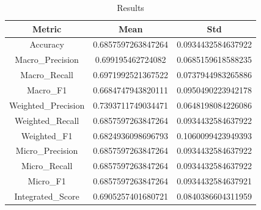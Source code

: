 \begin{table}[htbp]
\centering
\caption{Results}
\label{tab:csv}
\small
\setlength{\tabcolsep}{4pt}
\begin{tabular}{|c|c|c|}
\hline
Metric & Mean & Std \\
\hline
Accuracy & 0.6857597263847264 & 0.0934432584637922 \\
Macro_Precision & 0.699195462724082 & 0.0685159618588235 \\
Macro_Recall & 0.6971992521367522 & 0.0737944983265886 \\
Macro_F1 & 0.6684747943820111 & 0.0950490223942178 \\
Weighted_Precision & 0.7393711749034471 & 0.0648198084226086 \\
Weighted_Recall & 0.6857597263847264 & 0.0934432584637922 \\
Weighted_F1 & 0.6824936098696793 & 0.1060099423949393 \\
Micro_Precision & 0.6857597263847264 & 0.0934432584637922 \\
Micro_Recall & 0.6857597263847264 & 0.0934432584637922 \\
Micro_F1 & 0.6857597263847264 & 0.0934432584637921 \\
Integrated_Score & 0.6905257401680721 & 0.0840386604311959 \\
\hline
\end{tabular}
\end{table}